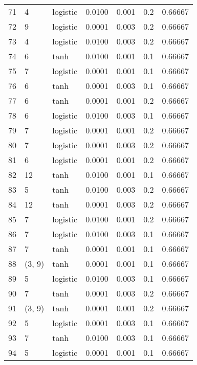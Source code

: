 \begin{tabular}{lllrrrr}
71  &           4 &  logistic &  0.0100 &  0.001 &  0.2 &   0.66667 \\
72  &           9 &  logistic &  0.0001 &  0.003 &  0.2 &   0.66667 \\
73  &           4 &  logistic &  0.0100 &  0.003 &  0.2 &   0.66667 \\
74  &           6 &      tanh &  0.0100 &  0.001 &  0.1 &   0.66667 \\
75  &           7 &  logistic &  0.0001 &  0.001 &  0.1 &   0.66667 \\
76  &           6 &      tanh &  0.0001 &  0.003 &  0.1 &   0.66667 \\
77  &           6 &      tanh &  0.0001 &  0.001 &  0.2 &   0.66667 \\
78  &           6 &  logistic &  0.0100 &  0.003 &  0.1 &   0.66667 \\
79  &           7 &  logistic &  0.0001 &  0.001 &  0.2 &   0.66667 \\
80  &           7 &  logistic &  0.0001 &  0.003 &  0.2 &   0.66667 \\
81  &           6 &  logistic &  0.0001 &  0.001 &  0.2 &   0.66667 \\
82  &          12 &      tanh &  0.0100 &  0.001 &  0.1 &   0.66667 \\
83  &           5 &      tanh &  0.0100 &  0.003 &  0.2 &   0.66667 \\
84  &          12 &      tanh &  0.0001 &  0.003 &  0.2 &   0.66667 \\
85  &           7 &  logistic &  0.0100 &  0.001 &  0.2 &   0.66667 \\
86  &           7 &  logistic &  0.0100 &  0.003 &  0.1 &   0.66667 \\
87  &           7 &      tanh &  0.0001 &  0.001 &  0.1 &   0.66667 \\
88  &      (3, 9) &      tanh &  0.0001 &  0.001 &  0.1 &   0.66667 \\
89  &           5 &  logistic &  0.0100 &  0.003 &  0.1 &   0.66667 \\
90  &           7 &      tanh &  0.0001 &  0.003 &  0.2 &   0.66667 \\
91  &      (3, 9) &      tanh &  0.0001 &  0.001 &  0.2 &   0.66667 \\
92  &           5 &  logistic &  0.0001 &  0.003 &  0.1 &   0.66667 \\
93  &           7 &      tanh &  0.0100 &  0.003 &  0.1 &   0.66667 \\
94  &           5 &  logistic &  0.0001 &  0.001 &  0.1 &   0.66667 \\

\end{tabular}
